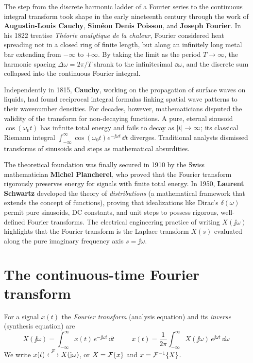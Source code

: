 \begin{historybox}
The step from the discrete harmonic ladder of a Fourier series to the continuous integral transform
took shape in the early nineteenth century through the work of \textbf{Augustin-Louis Cauchy}, \textbf{Sim\'{e}on Denis
Poisson}, and \textbf{Joseph Fourier}. In his 1822 treatise \emph{Th\'{e}orie analytique de la
chaleur}, Fourier considered heat spreading not in a closed ring of finite length, but along an
infinitely long metal bar extending from $-\infty$ to $+\infty$. By taking the limit as the
period $T \to \infty$, the harmonic spacing $\Delta\omega = 2\pi/T$ shrank to the infinitesimal
$\dd\omega$, and the discrete sum collapsed into the continuous Fourier integral.

Independently in 1815, \textbf{Cauchy}, working on the propagation of surface waves on liquids, had
found reciprocal integral formulas linking spatial wave patterns to their wavenumber
densities. For decades, however, mathematicians disputed the validity of the transform for
non-decaying functions. A pure, eternal sinusoid $\cos(\omega_0 t)$ has infinite total energy and
fails to decay as $\lvert t\rvert \to \infty$; its classical Riemann integral $\int_{-\infty}^\infty
\cos(\omega_0 t) e^{-\jj\omega t}\,\dd t$ diverges. Traditional analysts dismissed transforms
of sinusoids and steps as mathematical absurdities.

The theoretical foundation was finally secured in 1910 by the Swiss mathematician \textbf{Michel
Plancherel}, who proved that the Fourier transform rigorously preserves energy for signals with finite
total energy. In 1950, \textbf{Laurent Schwartz} developed the theory of \emph{distributions} (a
mathematical framework that extends the concept of functions), proving that idealizations like Dirac's
$\delta(\omega)$ permit pure sinusoids, DC constants, and unit steps to possess rigorous,
well-defined Fourier transforms. The electrical engineering practice of writing $X(\jj\omega)$
highlights that the Fourier transform is the Laplace transform $X(s)$ evaluated along the
pure imaginary frequency axis $s = \jj\omega$.
\end{historybox}

\section{The continuous-time Fourier transform}
\label{ch07:ctft-defn}

\begin{definition}
\label{ch07:def-pair}
For a signal $x(t)$ the \emph{Fourier transform} (analysis equation) and its
\emph{inverse} (synthesis equation) are
\begin{equation}
\label{ch07:ftpair}
\boxed{\;X(\jj\omega) = \int_{-\infty}^{\infty} x(t)\, e^{-\jj\omega t}\, \dd t\;}
\qquad
\boxed{\;x(t) = \frac{1}{2\pi}\int_{-\infty}^{\infty} X(\jj\omega)\, e^{\jj\omega t}\, \dd\omega\;}
\end{equation}
We write $x(t) \overset{\mathcal{F}}{\longleftrightarrow} X(\mathrm{j}\omega)$, or $X = \mathcal{F}\{x\}$ and
$x = \mathcal{F}^{-1}\{X\}$.
\end{definition}

